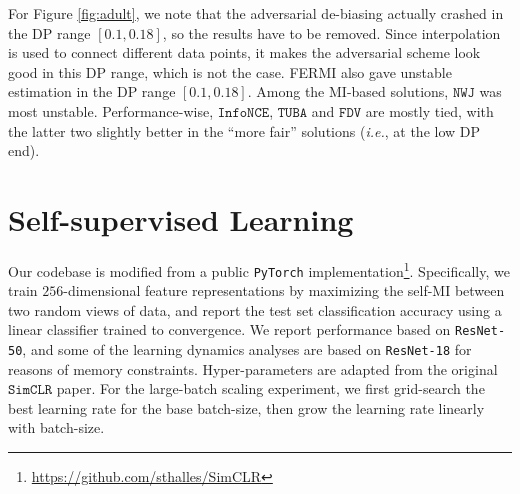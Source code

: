 \documentclass{article}
\theoremstyle{plain}
\theoremstyle{definition}
\theoremstyle{remark}
\newcommand{\infonce}{\texttt{InfoNCE}}
\newcommand{\TUBA}{\texttt{TUBA}}
\newcommand{\NWJ}{\texttt{NWJ}}
\newcommand{\FDV}{\texttt{FDV}}
\newcommand{\SimCLR}{\texttt{SimCLR}}
\begin{document}
				
				For Figure \ref{fig:adult}, we note that the adversarial de-biasing actually crashed in the DP range $[0.1, 0.18]$, so the results have to be removed. Since interpolation is used to connect different data points, it makes the adversarial scheme look good in this DP range, which is not the case. FERMI also gave unstable estimation in the DP range $[0.1, 0.18]$. Among the MI-based solutions, $\NWJ$ was most unstable. Performance-wise, $\infonce$, $\TUBA$ and $\FDV$ are mostly tied, with the latter two slightly better in the ``more fair'' solutions ({\it i.e.}, at the low DP end).
				
				
				\section{Self-supervised Learning}
				
				
				Our codebase is modified from a public \texttt{PyTorch} implementation\footnote{\url{https://github.com/sthalles/SimCLR}}. Specifically, we train $256$-dimensional feature representations by maximizing the self-MI between two random views of data, and report the test set classification accuracy using a linear classifier trained to convergence. We report performance based on \texttt{ResNet-50}, and some of the learning dynamics analyses are based on \texttt{ResNet-18} for reasons of memory constraints. Hyper-parameters are adapted from the original $\SimCLR$ paper. For the large-batch scaling experiment, we first grid-search the best learning rate for the base batch-size, then grow the learning rate linearly with batch-size. 
				
\end{document}
